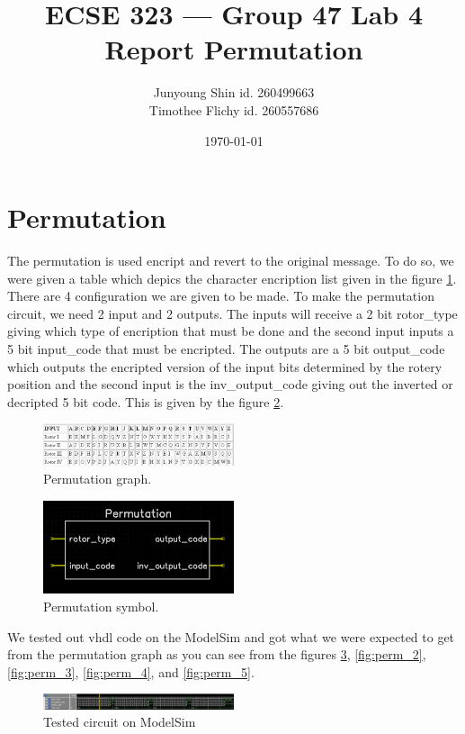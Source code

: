 \documentclass[10pt]{article}
\title{ECSE 323 --- Group 47 Lab 4 Report Permutation}
\author{Junyoung Shin id. 260499663\\ Timothee Flichy id. 260557686}
\date{\today}
\begin{document}
\maketitle
\section{Permutation}
The permutation is used encript and revert to the original message. To do so, we were given a table which depics the character encription list given in the figure \ref{fig:permuation}. There are 4 configuration we are given to be made. To make the permutation circuit, we need 2 input and 2 outputs. The inputs will receive a 2 bit rotor\_type giving which type of encription that must be done and the second input inputs a 5 bit input\_code that must be encripted. The outputs are a 5 bit output\_code which outputs the encripted version of the input bits determined by the rotery position and the second input is the inv\_output\_code giving out the inverted or decripted 5 bit code. This is given by the figure \ref{fig:permuation_sym}.
\begin{figure}[!htb]
    \centering
    \includegraphics[width=0.5\textwidth]{./permutation.png}
    \caption{Permutation graph.}
    \label{fig:permuation}
\end{figure}
\begin{figure}[!htb]
    \centering
    \includegraphics[width=0.5\textwidth]{./permutation_circuit.png}
    \caption{Permutation symbol.}
    \label{fig:permuation_sym}
\end{figure}
We tested out vhdl code on the ModelSim and got what we were expected to get from the permutation graph as you can see from the figures \ref{fig:perm_1}, \ref{fig:perm_2}, \ref{fig:perm_3}, \ref{fig:perm_4}, and \ref{fig:perm_5}.
\begin{figure}[!htb]
    \centering
    \includegraphics[width=0.5\textwidth]{./perm_1.png}
    \caption{Tested circuit on ModelSim}
    \label{fig:perm_1}
\end{figure}
\end{document}
